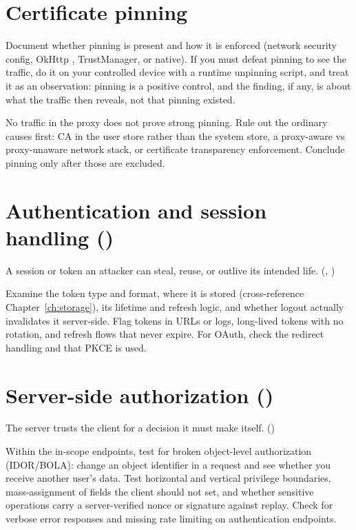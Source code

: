 \section{Certificate pinning}
Document whether pinning is present and how it is enforced (network security config, OkHttp , TrustManager, or native). If you must defeat pinning to see the traffic, do it on your controlled device with a runtime unpinning script, and treat it as an observation: pinning is a positive control, and the finding, if any, is about what the traffic then reveals, not that pinning existed.

\begin{trap}
No traffic in the proxy does not prove strong pinning. Rule out the ordinary causes first: CA in the user store rather than the system store, a proxy-aware vs proxy-unaware network stack, or certificate transparency enforcement. Conclude pinning only after those are excluded.
\end{trap}

\section{Authentication and session handling ()}
\begin{findingbox}
A session or token an attacker can steal, reuse, or outlive its intended life. (, )
\end{findingbox}
Examine the token type and format, where it is stored (cross-reference Chapter~\ref{ch:storage}), its lifetime and refresh logic, and whether logout actually invalidates it server-side. Flag tokens in URLs or logs, long-lived tokens with no rotation, and refresh flows that never expire. For OAuth, check the redirect handling and that PKCE is used.

\section{Server-side authorization ()}
\begin{findingbox}
The server trusts the client for a decision it must make itself. ()
\end{findingbox}
Within the in-scope endpoints, test for broken object-level authorization (IDOR/BOLA): change an object identifier in a request and see whether you receive another user's data. Test horizontal and vertical privilege boundaries, mass-assignment of fields the client should not set, and whether sensitive operations carry a server-verified nonce or signature against replay. Check for verbose error responses and missing rate limiting on authentication endpoints.

